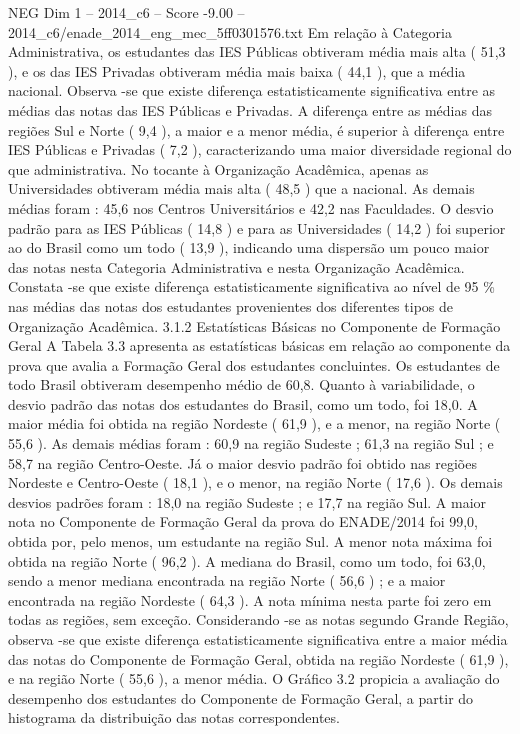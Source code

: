 \begin{textsample}{NEG Dim 1 – 2014\_c6 – Score -9.00 – 2014\_c6/enade\_2014\_eng\_mec\_5ff0301576.txt}
Em relação à Categoria Administrativa, os estudantes das IES Públicas obtiveram média mais alta ( 51,3 ), e os das IES Privadas obtiveram média mais baixa ( 44,1 ), que a média nacional.
Observa -se que existe diferença estatisticamente significativa entre as médias das notas das IES Públicas e Privadas.
A diferença entre as médias das regiões Sul e Norte ( 9,4 ), a maior e a menor média, é superior à diferença entre IES Públicas e Privadas ( 7,2 ), caracterizando uma maior diversidade regional do que administrativa.
No tocante à Organização Acadêmica, apenas as Universidades obtiveram média mais alta ( 48,5 ) que a nacional.
As demais médias foram : 45,6 nos Centros Universitários e 42,2 nas Faculdades.
O desvio padrão para as IES Públicas ( 14,8 ) e para as Universidades ( 14,2 ) foi superior ao do Brasil como um todo ( 13,9 ), indicando uma dispersão um pouco maior das notas nesta Categoria Administrativa e nesta Organização Acadêmica.
Constata -se que existe diferença estatisticamente significativa ao nível de 95 \% nas médias das notas dos estudantes provenientes dos diferentes tipos de Organização Acadêmica. 3.1.2 Estatísticas Básicas no Componente de Formação Geral A Tabela 3.3 apresenta as estatísticas básicas em relação ao componente da prova que avalia a Formação Geral dos estudantes concluintes.
Os estudantes de todo Brasil obtiveram desempenho médio de 60,8.
Quanto à variabilidade, o desvio padrão das notas dos estudantes do Brasil, como um todo, foi 18,0.
A maior média foi obtida na região Nordeste ( 61,9 ), e a menor, na região Norte ( 55,6 ).
As demais médias foram : 60,9 na região Sudeste ; 61,3 na região Sul ; e 58,7 na região Centro-Oeste.
Já o maior desvio padrão foi obtido nas regiões Nordeste e Centro-Oeste ( 18,1 ), e o menor, na região Norte ( 17,6 ).
Os demais desvios padrões foram : 18,0 na região Sudeste ; e 17,7 na região Sul.
A maior nota no Componente de Formação Geral da prova do ENADE/2014 foi 99,0, obtida por, pelo menos, um estudante na região Sul.
A menor nota máxima foi obtida na região Norte ( 96,2 ).
A mediana do Brasil, como um todo, foi 63,0, sendo a menor mediana encontrada na região Norte ( 56,6 ) ; e a maior encontrada na região Nordeste ( 64,3 ).
A nota mínima nesta parte foi zero em todas as regiões, sem exceção.
Considerando -se as notas segundo Grande Região, observa -se que existe diferença estatisticamente significativa entre a maior média das notas do Componente de Formação Geral, obtida na região Nordeste ( 61,9 ), e na região Norte ( 55,6 ), a menor média.
O Gráfico 3.2 propicia a avaliação do desempenho dos estudantes do Componente de Formação Geral, a partir do histograma da distribuição das notas correspondentes.

\end{textsample}
